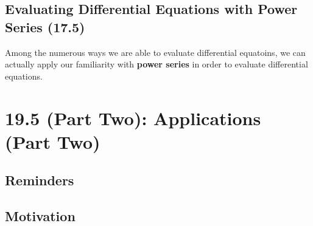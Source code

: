 \documentclass{report}
\begin{document}
\begin{sloppypar}
\section{Evaluating Differential Equations with Power Series (17.5)}
Among the numerous ways we are able to evaluate
differential equatoins, we can actually apply
our familiarity with \textbf{power series} in order
to evaluate differential equations.


\chapter{19.5 (Part Two): Applications (Part Two)}
\section{Reminders}
\section{Motivation}
\end{sloppypar}
\end{document}
